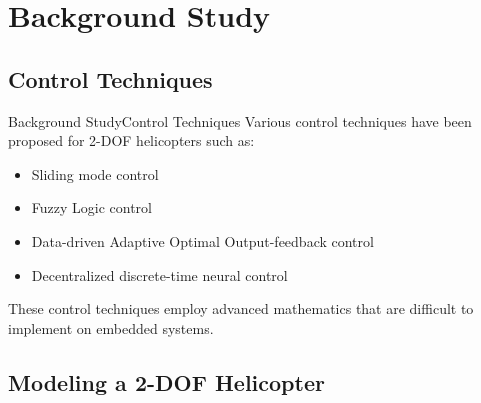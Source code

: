\documentclass{beamer}
\begin{document}

\section{Background Study}

\subsection{Control Techniques}

\begin{frame}{Background Study}{Control Techniques}
    Various control techniques have been proposed for 2-DOF helicopters such as:
    \begin{itemize}
        \item Sliding mode control \cite{Ahmed2010-Sliding} %
        \item Fuzzy Logic control 
        \cite{Chang2017-Fuzzy}
        \cite{Kayacan2016-Fuzzy}
        \cite{Mendez-Monroy2012-Fuzzy} 
        \item Data-driven Adaptive Optimal Output-feedback control \cite{Gao2016-DataDriven} %
        \item Decentralized discrete-time neural control \cite{Hernandez-Gonzalez2012-Decentralized} %
    \end{itemize}
    These control techniques employ advanced mathematics that are difficult to implement on embedded systems.
\end{frame}


\subsection{Modeling a 2-DOF Helicopter}
\end{document}
